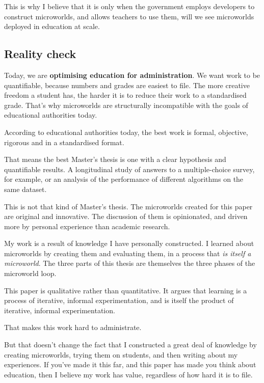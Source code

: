 This is why I believe that it is only when the government employs
developers to construct microworlds, and allows teachers to use them,
will we see microworlds deployed in education at scale.

\subsection{Reality check}

Today, we are \textbf{optimising education for administration}. We want work to be quantifiable, because numbers and grades are easiest to file. The more creative freedom a student has, the harder it is to reduce their work to a standardised grade. That's why microworlds are structurally incompatible with the goals of educational authorities today.

According to educational authorities today, the best work is formal, objective, rigorous and in a standardised format. 

That means the best Master's thesis is one with a clear hypothesis and quantifiable results. A longitudinal study of answers to a multiple-choice survey, for example, or an analysis of the performance of different algorithms on the same dataset.

This is not that kind of Master's thesis. The microworlds created for this paper are original and innovative. The discussion of them is opinionated, and driven more by personal experience than academic research. 

My work is a result of knowledge I have personally constructed. I learned about microworlds by creating them and evaluating them, in a process that \textit{is itself a microworld}. The three parts of this thesis are themselves the three phases of the microworld loop.

This paper is qualitative rather than quantitative. It argues that learning is a process of iterative, informal experimentation, and is itself the product of iterative, informal experimentation. 

That makes this work hard to administrate.

But that doesn't change the fact that I constructed a great deal of knowledge by creating microworlds, trying them on students, and then writing about my experiences. If you've made it this far, and this paper has made you think about education, then I believe my work has value, regardless of how hard it is to file.
